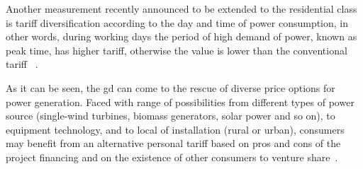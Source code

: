 Another measurement recently announced to be extended to the residential class is tariff diversification according to the day and time of power consumption,
in other words, during working days the period of high demand of power, known as peak time, has higher tariff, otherwise the value is lower than the conventional tariff
~\cite{tarifa_branca}. %



As it can be seen, the \gls{gd} can come to the rescue of diverse price options for power generation.
Faced with range of possibilities
from different types of power source (single-wind turbines, biomass generators, solar power and so on),
to equipment technology,
and to local of installation (rural or urban),
consumers may benefit from an alternative personal tariff based on pros and cons of the project financing and on the existence of other consumers to venture share~\cite{GD}.%



